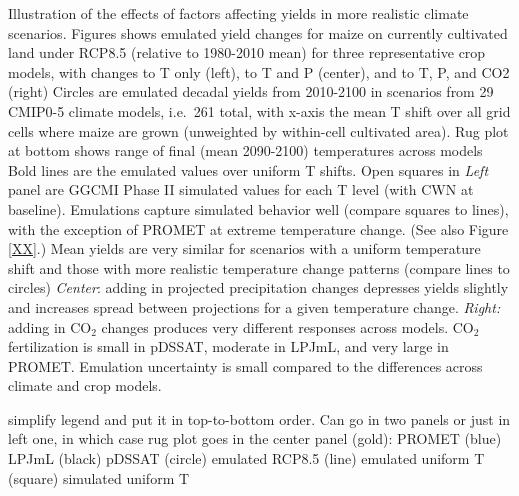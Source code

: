 Illustration of the effects of factors affecting yields in more realistic climate scenarios. 
Figures shows emulated yield changes for maize on currently cultivated land under RCP8.5 (relative to 1980-2010 mean) for three representative crop models, with changes to T only (left), to T and P (center), and to T, P, and CO2 (right)
 Circles are emulated decadal yields from 2010-2100 in scenarios from 29 CMIP0-5 climate models, i.e.\ 261 total, with x-axis the mean T shift over all grid cells where maize are grown (unweighted by within-cell cultivated area). Rug plot at bottom shows range of final (mean 2090-2100) temperatures across models
 Bold lines are the emulated values over uniform T shifts. Open squares in \textit{Left} panel are GGCMI Phase II simulated values for each T level (with CWN at baseline).  Emulations capture simulated behavior well (compare squares to lines), with the exception of PROMET at extreme temperature change. (See also Figure \ref{XX}.)
Mean yields are very similar for scenarios with a uniform temperature shift and those with more realistic temperature change patterns (compare lines to circles) 
\textit{Center}: adding in projected precipitation changes depresses yields slightly and increases spread between projections for a given temperature change. \textit{Right:} adding in CO$_2$ changes produces very different responses across models. CO$_2$ fertilization is small in pDSSAT, moderate in LPJmL, and very large in PROMET. 
Emulation uncertainty is small compared to the differences across climate and crop models.

simplify legend and put it in top-to-bottom order. Can go in two panels or just in left one, in which case rug plot goes in the center panel
(gold): PROMET
(blue) LPJmL
(black) pDSSAT
(circle) emulated RCP8.5
(line) emulated uniform T
(square) simulated uniform T



